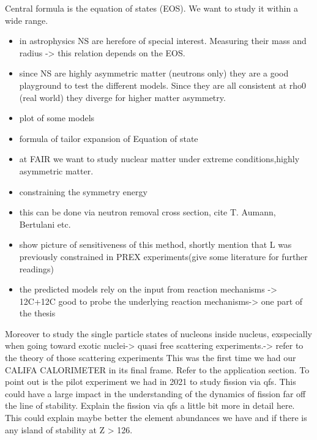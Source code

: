 Central formula is the equation of states (EOS). We want to study it within a wide range. 
\begin{itemize}
\item in astrophysics NS are herefore of special interest. Measuring their mass and radius -> this relation depends on the EOS. 
\item since NS are highly asymmetric matter (neutrons only) they are a good playground to test the different models. Since they are all consistent at rho0 (real world) they diverge for higher matter asymmetry. 
\item plot of some models
\item formula of tailor expansion of Equation of state
\item at FAIR we want to study  nuclear matter under extreme conditions,highly asymmetric matter. 
\item constraining the symmetry energy
\item this can be done via neutron removal cross section, cite T. Aumann, Bertulani etc.
\item show picture of sensitiveness of this method, shortly mention that L was previously constrained in PREX experiments(give some literature for further readings)
\item the predicted models rely on the input from reaction mechanisms -> 12C+12C good to probe the underlying reaction mechanisms-> one part of the thesis
\end{itemize}
Moreover to study the single particle states of nucleons inside nucleus, exspecially when going toward exotic nuclei-> quasi free scattering experiments.-> refer to the theory of those scattering experiments
This was the first time we had our CALIFA CALORIMETER in its final frame. 
Refer to the application section. \newline
To point out is the pilot experiment we had in 2021 to study fission via qfs. This could have a large impact in the understanding of the dynamics of fission far off the line of stability. \newline
Explain the fission via qfs a little bit more in detail here.\newline
This could explain maybe better the element abundances we have and if there is any island of stability at Z > 126.

